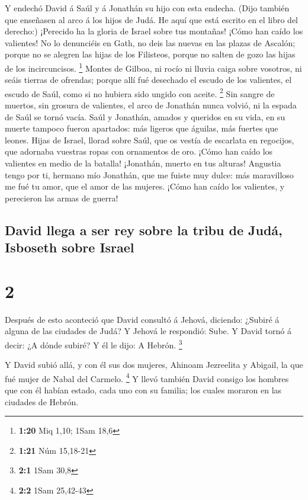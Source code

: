  Y endechó David á Saúl y á Jonathán su hijo con esta
endecha.  (Dijo también que enseñasen al arco á los hijos
de Judá. He aquí que está escrito en el libro del derecho:)
 ¡Perecido ha la gloria de Israel sobre tus montañas! ¡Cómo
han caído los valientes!  No lo denunciéis en Gath, no deis
las nuevas en las plazas de Ascalón; porque no se alegren las hijas de
los Filisteos, porque no salten de gozo las hijas de los incircuncisos.
\footnote{\textbf{1:20} Miq 1,10; 1Sam 18,6}  Montes de
Gilboa, ni rocío ni lluvia caiga sobre vosotros, ni seáis tierras de
ofrendas; porque allí fué desechado el escudo de los valientes, el
escudo de Saúl, como si no hubiera sido ungido con aceite. \footnote{\textbf{1:21}
  Núm 15,18-21}  Sin sangre de muertos, sin grosura de
valientes, el arco de Jonathán nunca volvió, ni la espada de Saúl se
tornó vacía.  Saúl y Jonathán, amados y queridos en su
vida, en su muerte tampoco fueron apartados: más ligeros que águilas,
más fuertes que leones.  Hijas de Israel, llorad sobre
Saúl, que os vestía de escarlata en regocijos, que adornaba vuestras
ropas con ornamentos de oro.  ¡Cómo han caído los valientes
en medio de la batalla! ¡Jonathán, muerto en tus alturas! 
Angustia tengo por ti, hermano mío Jonathán, que me fuiste muy dulce:
más maravilloso me fué tu amor, que el amor de las mujeres.
 ¡Cómo han caído los valientes, y perecieron las armas de
guerra!

\hypertarget{david-llega-a-ser-rey-sobre-la-tribu-de-juduxe1-isboseth-sobre-israel}{%
\subsection{David llega a ser rey sobre la tribu de Judá, Isboseth sobre
Israel}\label{david-llega-a-ser-rey-sobre-la-tribu-de-juduxe1-isboseth-sobre-israel}}

\hypertarget{section-1}{%
\section{2}\label{section-1}}

 Después de esto aconteció que David consultó á Jehová,
diciendo: ¿Subiré á alguna de las ciudades de Judá? Y Jehová le
respondió: Sube. Y David tornó á decir: ¿A dónde subiré? Y él le dijo: A
Hebrón. \footnote{\textbf{2:1} 1Sam 30,8}

 Y David subió allá, y con él sus dos mujeres, Ahinoam
Jezreelita y Abigail, la que fué mujer de Nabal del Carmelo. \footnote{\textbf{2:2}
  1Sam 25,42-43}  Y llevó también David consigo los hombres
que con él habían estado, cada uno con su familia; los cuales moraron en
las ciudades de Hebrón.

